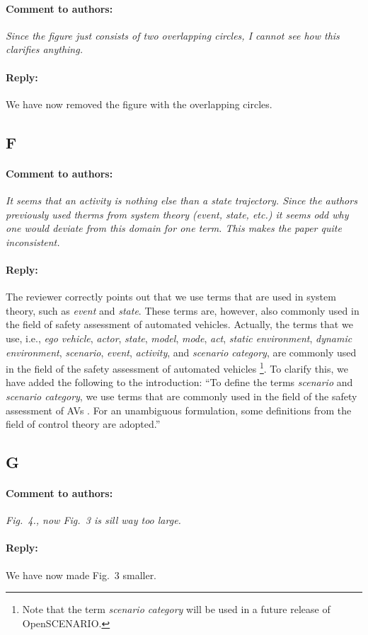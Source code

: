 \documentclass[10pt,final,a4paper,oneside,onecolumn]{article}
\newcommand{\toauthor}{\paragraph*{Comment to authors:} \itshape}
\newcommand{\fromauthor}{\paragraph*{Reply:} \normalfont}
\newcommand{\toauthornew}{\paragraph*{Comment to authors:} \itshape}
\newcommand{\fromauthornew}{\paragraph*{Reply:} \normalfont}
\newcommand{\cstart}{\cbstart\color{red}}
\newcommand{\cend}{\cbend\color{black}}
\begin{document}
\toauthornew Since the figure just consists of two overlapping circles, I cannot see how this clarifies anything.

\fromauthornew We have now removed the figure with the overlapping circles.



\subsection*{F}

%

\toauthornew It seems that an activity is nothing else than a state trajectory. Since the authors previously used therms from system theory (event, state, etc.) it seems odd why one would deviate from this domain for one term. This makes the paper quite inconsistent. 

\fromauthornew The reviewer correctly points out that we use terms that are used in system theory, such as \emph{event} and \emph{state}. These terms are, however, also commonly used in the field of safety assessment of automated vehicles. Actually, the terms that we use, i.e., \emph{ego vehicle}, \emph{actor}, \emph{state}, \emph{model}, \emph{mode}, \emph{act}, \emph{static environment}, \emph{dynamic environment}, \emph{scenario}, \emph{event}, \emph{activity}, and \emph{scenario category}, are commonly used in the field of the safety assessment of automated vehicles \autocite{catapult2018musicc,catapult2018regulating,sigsim2019glossary,openscenario,ulbrich2015,geyer2014}\footnote{Note that the term \emph{scenario category} will be used in a future release of OpenSCENARIO.}. To clarify this, we have added the following to the introduction: ``\cstart To define the terms \emph{scenario} and \emph{scenario category}, we use terms that are commonly used in the field of the safety assessment of AVs \autocite{catapult2018musicc,catapult2018regulating,sigsim2019glossary,openscenario,ulbrich2015,geyer2014}. For an unambiguous formulation, some definitions from the field of control theory are adopted.\cend''



\subsection*{G}

\toauthornew Fig.\ 4., now Fig.\ 3 is sill way too large. 

\fromauthornew We have now made Fig.\ 3 smaller.




\printbibliography
\end{document}
